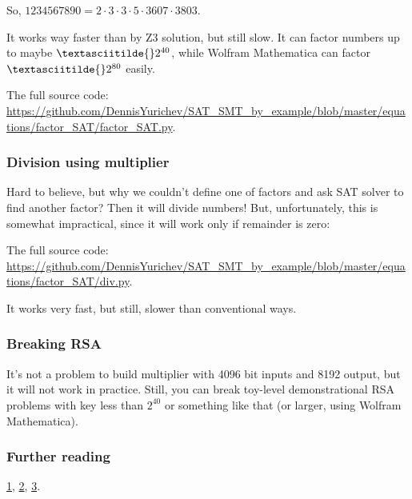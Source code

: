 So, $1234567890 = 2 \cdot 3 \cdot 3 \cdot 5 \cdot 3607 \cdot 3803$.

It works way faster than by Z3 solution, but still slow.
It can factor numbers up to maybe $\textasciitilde{}2^{40}$, while Wolfram Mathematica can factor
$\textasciitilde{}2^{80}$ easily.

The full source code: \url{https://github.com/DennisYurichev/SAT_SMT_by_example/blob/master/equations/factor_SAT/factor_SAT.py}.

\subsubsection{Division using multiplier}

Hard to believe, but why we couldn't define one of factors and ask SAT solver to find another factor?
Then it will divide numbers!
But, unfortunately, this is somewhat impractical, since it will work only if remainder is zero:



The full source code: \url{https://github.com/DennisYurichev/SAT_SMT_by_example/blob/master/equations/factor_SAT/div.py}.

It works very fast, but still, slower than conventional ways.

\subsubsection{Breaking \ac{RSA}}

It's not a problem to build multiplier with 4096 bit inputs and 8192 output, but it will not work in practice.
Still, you can break toy-level demonstrational RSA problems with key less than $2^{40}$ or something like that
(or larger, using Wolfram Mathematica).

\subsubsection{Further reading}

\href{https://yurichev.com/mirrors/SAT_factor/Encoding%20Basic%20Arithmetic%20Operations%20for%20SAT-Solvers.pdf}{1},
\href{https://yurichev.com/mirrors/SAT_factor/Factoring%20integers%20with%20parallel%20SAT%20solvers.pdf}{2},
\href{https://yurichev.com/mirrors/SAT_factor/Hard%20Instance%20Generation%20for%20SAT.pdf}{3}.

